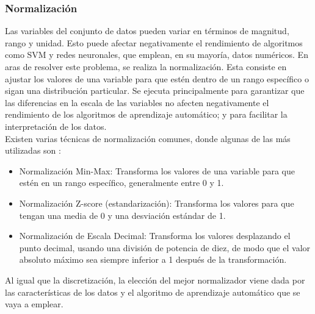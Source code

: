 \subsubsection*{Normalización}
Las variables del conjunto de datos pueden variar en términos de magnitud, rango y unidad. Esto puede afectar negativamente el rendimiento de algoritmos como SVM y redes neuronales, que emplean, en su mayoría, datos numéricos. En aras de resolver este problema, se realiza la normalización. Esta consiste  en ajustar los valores de una variable para que estén dentro de un rango específico o sigan una distribución particular. Se ejecuta principalmente para garantizar que las diferencias en la escala de las variables no afecten negativamente el rendimiento de los algoritmos de aprendizaje automático; y para facilitar la interpretación de los datos.\\
Existen varias técnicas de normalización comunes, donde algunas de las más utilizadas son \citep{garcia2012survey}:
\begin{itemize}
	\item Normalización Min-Max: Transforma los valores de una variable para que estén en un rango específico, generalmente entre 0 y 1.
	\item Normalización Z-score (estandarización): Transforma los valores para que tengan una media de 0 y una desviación estándar de 1.
	\item Normalización de Escala Decimal: Transforma los valores desplazando el punto decimal, usando una división de potencia de diez, de modo que el valor absoluto máximo sea siempre inferior a 1 después de la transformación.
\end{itemize}
Al igual que la discretización, la elección del mejor normalizador viene dada por las características de los datos y el algoritmo de aprendizaje automático que se vaya a emplear.

